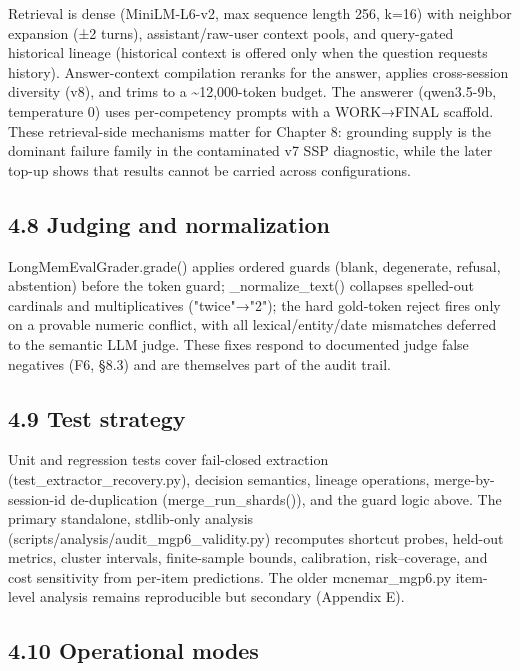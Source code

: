 Retrieval is dense (MiniLM-L6-v2, max sequence length 256, k=16) with
neighbor expansion (±2 turns), assistant/raw-user context pools, and
query-gated historical lineage (historical context is offered only when
the question requests history). Answer-context compilation reranks for
the answer, applies cross-session diversity (v8), and trims to a
\textasciitilde12,000-token budget. The answerer (qwen3.5-9b,
temperature 0) uses per-competency prompts with a WORK→FINAL scaffold.
These retrieval-side mechanisms matter for Chapter 8: grounding supply
is the dominant failure family in the contaminated v7 SSP diagnostic,
while the later top-up shows that results cannot be carried across
configurations.

\subsection{4.8 Judging and
normalization}\label{judging-and-normalization}

LongMemEvalGrader.grade() applies ordered guards (blank, degenerate,
refusal, abstention) before the token guard; \_normalize\_text()
collapses spelled-out cardinals and multiplicatives ("twice"→"2"); the
hard gold-token reject fires only on a provable numeric conflict, with
all lexical/entity/date mismatches deferred to the semantic LLM judge.
These fixes respond to documented judge false negatives (F6, §8.3) and
are themselves part of the audit trail.

\subsection{4.9 Test strategy}\label{test-strategy}

Unit and regression tests cover fail-closed extraction
(test\_extractor\_recovery.py), decision semantics, lineage operations,
merge-by-session-id de-duplication (merge\_run\_shards()), and the guard
logic above. The primary standalone, stdlib-only analysis
(scripts/analysis/audit\_mgp6\_validity.py) recomputes shortcut probes,
held-out metrics, cluster intervals, finite-sample bounds, calibration,
risk--coverage, and cost sensitivity from per-item predictions. The
older mcnemar\_mgp6.py item-level analysis remains reproducible but
secondary (Appendix E).

\subsection{4.10 Operational modes}\label{operational-modes}

